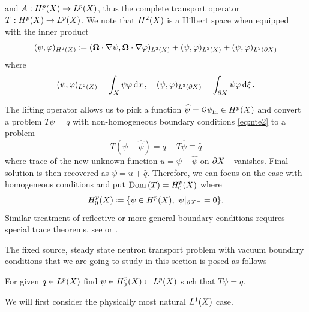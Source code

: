 %
and $A : \Hp(X) \to \Lp(X)$, thus the complete transport operator \linebreak\mbox{$T: \Hp(X) \to \Lp(X)$}.
We note that $\Hp[2](X)$ is a Hilbert space when equipped with the inner product
\begin{equation*}\label{eq:ip}
	\ip{\Hp[2](X)}{\psi,\varphi} \coloneqq \ip{\Lp[2](X)}{\bomega\cdot\nabla \psi, \bomega\cdot\nabla \varphi} +
	\ip{\Lp[2](X)}{\psi,\varphi} +
	\ip{\Lp[2](\pX)}{\psi,\varphi} 	
\end{equation*}
where
\begin{equation}\label{eq:ipL2}
	\ip{\Lp[2](X)}{\psi,\varphi} = \int_X \psi \varphi \,\d{x},\quad
	\ip{\Lp[2](\pX)}{\psi,\varphi} = \int_{\pX} \psi \varphi \,\d{\xi}.
\end{equation}

The lifting operator allows us to pick a function $\widehat \psi = \mathcal{G}\psi_{\text{in}} \in \Hp(X)$ and convert a
problem $T\psi = q$ with non-homogeneous boundary conditions \eqref{eq:nte2} to a problem 
$$
	T(\psi - \widehat\psi) = q - T\widehat\psi \equiv \widehat q
$$ 
where trace of the new unknown function $u = \psi - \widehat\psi$ on $\pX[-]$ vanishes. Final solution is then recovered
as $\psi = u + \widehat{q}$. Therefore, we can focus on the case with homogeneous conditions and put $\Dom{T} =
\Hpnot(X)$ where
$$
	\Hpnot(X) \coloneqq \{\psi\in \Hp(X),\ \psi\vert_{\pX[-]} = 0\}.
$$
%
Similar treatment of reflective or more general boundary conditions requires special trace theorems, see
\cite[Chap. XXI, Appendix of \S2]{DautrayLions} or \cite[Chap. 2]{Agoshkov}.

The fixed source, steady state neutron transport problem with vacuum boundary conditions that we are going to study in
this section is posed as follows

\begin{problem}\label{prb:1}
For given $q\in \Lp(X)$ find $\psi \in \Hpnot(X) \subset \Lp(X)$ such that
$
     T\psi = q.
$
\end{problem}

We will first consider the physically most natural $\Lp[1](X)$ case.

